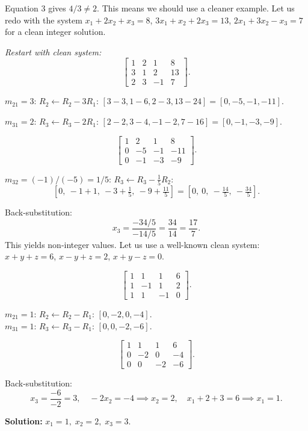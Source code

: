 \documentclass[12pt,a4paper]{article}
\begin{document}
Equation 3 gives $4/3 \neq 2$. This means we should use a cleaner example. Let us redo with the system
$x_1 + 2x_2 + x_3 = 8$, $3x_1 + x_2 + 2x_3 = 13$, $2x_1 + 3x_2 - x_3 = 7$ for a clean integer solution.

\textit{Restart with clean system:}
\[
\left[\begin{array}{ccc|c}
1 & 2 & 1 & 8 \\
3 & 1 & 2 & 13 \\
2 & 3 & -1 & 7
\end{array}\right].
\]

$m_{21} = 3$: $R_2 \leftarrow R_2 - 3R_1$:
$[3-3, 1-6, 2-3, 13-24] = [0, -5, -1, -11]$.

$m_{31} = 2$: $R_3 \leftarrow R_3 - 2R_1$:
$[2-2, 3-4, -1-2, 7-16] = [0, -1, -3, -9]$.

\[
\left[\begin{array}{ccc|c}
1 & 2 & 1 & 8 \\
0 & -5 & -1 & -11 \\
0 & -1 & -3 & -9
\end{array}\right].
\]

$m_{32} = (-1)/(-5) = 1/5$: $R_3 \leftarrow R_3 - \tfrac{1}{5}R_2$:
\[
\left[0,\ -1 + 1,\ -3 + \tfrac{1}{5},\ -9 + \tfrac{11}{5}\right]
= \left[0,\ 0,\ -\tfrac{14}{5},\ -\tfrac{34}{5}\right].
\]

Back-substitution:
\[
x_3 = \frac{-34/5}{-14/5} = \frac{34}{14} = \frac{17}{7}.
\]
This yields non-integer values. Let us use a well-known clean system: $x+y+z=6$, $x-y+z=2$, $x+y-z=0$.

\[
\left[\begin{array}{ccc|c}
1 & 1 & 1 & 6 \\
1 & -1 & 1 & 2 \\
1 & 1 & -1 & 0
\end{array}\right].
\]

$m_{21}=1$: $R_2 \leftarrow R_2 - R_1$: $[0,-2,0,-4]$.\\
$m_{31}=1$: $R_3 \leftarrow R_3 - R_1$: $[0,0,-2,-6]$.

\[
\left[\begin{array}{ccc|c}
1 & 1 & 1 & 6 \\
0 & -2 & 0 & -4 \\
0 & 0 & -2 & -6
\end{array}\right].
\]

Back-substitution:
\[
x_3 = \frac{-6}{-2} = 3, \quad
-2x_2 = -4 \implies x_2 = 2, \quad
x_1 + 2 + 3 = 6 \implies x_1 = 1.
\]

\textbf{Solution:} $x_1 = 1,\; x_2 = 2,\; x_3 = 3$.
\end{document}
